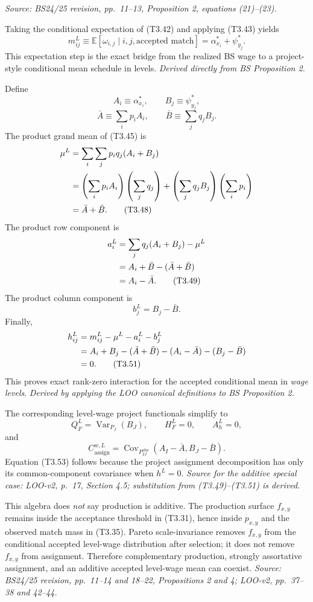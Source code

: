 \documentclass[11pt]{article}
\begin{document}
\textit{Source: BS24/25 revision, pp.\ 11--13, Proposition 2,
equations (21)--(23).}

Taking the conditional expectation of (T3.42) and applying (T3.43) yields
\[
m^L_{ij}
\equiv
\mathbb E[
\omega_{i,j}\mid i,j,\text{accepted match}
]
=
\alpha^*_{x_i}+\psi^*_{y_j}.
\tag{T3.45}
\]
This expectation step is the exact bridge from the realized BS wage to a
project-style conditional mean schedule in levels.
\textit{Derived directly from BS Proposition 2.}

Define
\[
A_i\equiv\alpha^*_{x_i},
\qquad
B_j\equiv\psi^*_{y_j},
\tag{T3.46}
\]
\[
\bar A\equiv\sum_ip_iA_i,
\qquad
\bar B\equiv\sum_jq_jB_j.
\tag{T3.47}
\]
The product grand mean of (T3.45) is
\begin{align}
\mu^L
&=
\sum_i\sum_jp_iq_j(A_i+B_j) \notag\\
&=
\left(\sum_ip_iA_i\right)\left(\sum_jq_j\right)
+\left(\sum_jq_jB_j\right)\left(\sum_ip_i\right) \notag\\
&=
\bar A+\bar B.
\tag{T3.48}
\end{align}
The product row component is
\begin{align}
a_i^L
&=
\sum_jq_j(A_i+B_j)-\mu^L \notag\\
&=
A_i+\bar B-(\bar A+\bar B) \notag\\
&=
A_i-\bar A.
\tag{T3.49}
\end{align}
The product column component is
\[
b_j^L=B_j-\bar B.
\tag{T3.50}
\]
Finally,
\begin{align}
h_{ij}^L
&=
m_{ij}^L-\mu^L-a_i^L-b_j^L \notag\\
&=
A_i+B_j-(\bar A+\bar B)
-(A_i-\bar A)-(B_j-\bar B) \notag\\
&=0.
\tag{T3.51}
\end{align}
This proves exact rank-zero interaction for the accepted conditional mean in
\emph{wage levels}.
\textit{Derived by applying the LOO canonical definitions to BS Proposition
2.}

The corresponding level-wage project functionals simplify to
\[
Q_F^L=\operatorname{Var}_{P_J}(B_J),
\qquad
H_F^L=0,
\qquad
A_h^L=0,
\tag{T3.52}
\]
and
\[
C_{\mathrm{assign}}^{w,L}
=
\operatorname{Cov}_{P^{\mathrm{obs}}_{IJ}}
(A_I-\bar A,B_J-\bar B).
\tag{T3.53}
\]
Equation (T3.53) follows because the project assignment decomposition has
only its common-component covariance when \(h^L=0\).
\textit{Source for the additive special case: LOO-v2, p.\ 17,
Section 4.5; substitution from (T3.49)--(T3.51) is derived.}

This algebra does \emph{not} say production is additive.  The production
surface \(f_{x,y}\) remains inside the acceptance threshold in (T3.31), hence
inside \(p_{x,y}\) and the observed match mass in (T3.35).  Pareto
scale-invariance removes \(f_{x,y}\) from the conditional accepted level-wage
distribution after selection; it does not remove \(f_{x,y}\) from assignment.
Therefore complementary production, strongly assortative assignment, and an
additive accepted level-wage mean can coexist.
\textit{Source: BS24/25 revision, pp.\ 11--14 and 18--22, Propositions 2 and
4; LOO-v2, pp.\ 37--38 and 42--44.}
\end{document}
